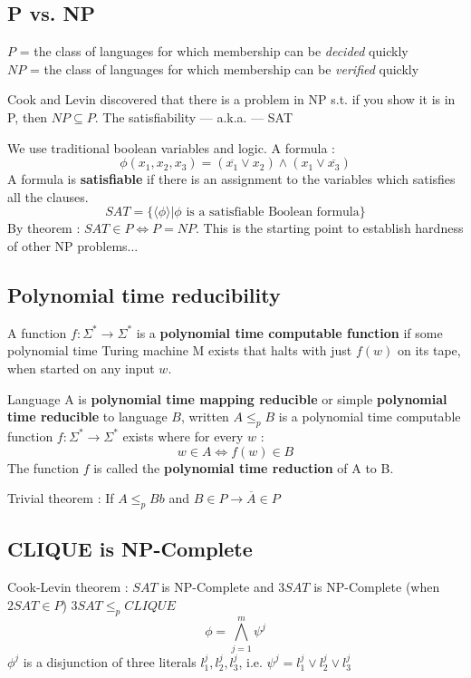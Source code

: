 \documentclass[12pt,a4paper]{article}
\newcommand{\<}{\langle}
\renewcommand{\>}{\rangle}
\begin{document}
\subsection{P vs. NP}
$P$ = the class of languages for which membership can be \textit{decided} quickly\\
$NP$ = the class of languages for which membership can be \textit{verified} quickly

Cook and Levin discovered that there is a problem in NP s.t. if you show it is in P, then $NP \subseteq P$. The satisfiability --- a.k.a. --- SAT

We use traditional boolean variables and logic. A formula :
\[\phi(x_1,x_2,x_3) = (\overline{x_1} \vee x_2) \wedge (x_1 \vee \overline{x_3})\]
A formula is \textbf{satisfiable} if there is an assignment to the variables which satisfies all the clauses.
\[SAT =  \{\langle \phi \rangle | \phi \text{ is a satisfiable Boolean formula}\}\]
By theorem : $SAT \in P \iff P = NP$. This is the starting point to establish hardness of other NP problems...
\subsection{Polynomial time reducibility}
\begin{blackbox}
    A function $f:\Sigma^* \to \Sigma^*$ is a \textbf{polynomial time computable function} if some polynomial time Turing machine M exists that halts with just $f(w)$ on its tape, when started on any input $w$.
\end{blackbox}
\begin{blackbox}
    Language A is \textbf{polynomial time mapping reducible} or simple \textbf{polynomial time reducible} to language $B$, written $A \leq_p B$ is a polynomial time computable function $f : \Sigma^* \to \Sigma^*$ exists where for every $w$ :
    \[w \in A \iff f(w) \in B\]
    The function $f$ is called the \textbf{polynomial time reduction} of A to B.
\end{blackbox}
Trivial theorem : If $A \leq_p Bb$ and $B \in P \to \overline{A} \in P$

\subsection{CLIQUE is NP-Complete}
Cook-Levin theorem : $SAT$ is NP-Complete and $3SAT$ is NP-Complete (when $2SAT \in P$)
 $3SAT \leq_p CLIQUE$
\[\phi = \bigwedge^m_{j=1} \psi^j\]
$\phi^j$ is a disjunction of three literals $l_1^j,l_2^j,l_3^j$, i.e. $\psi^ j = l_1^j \vee l_2^j \vee l_3^j$
\end{document}
